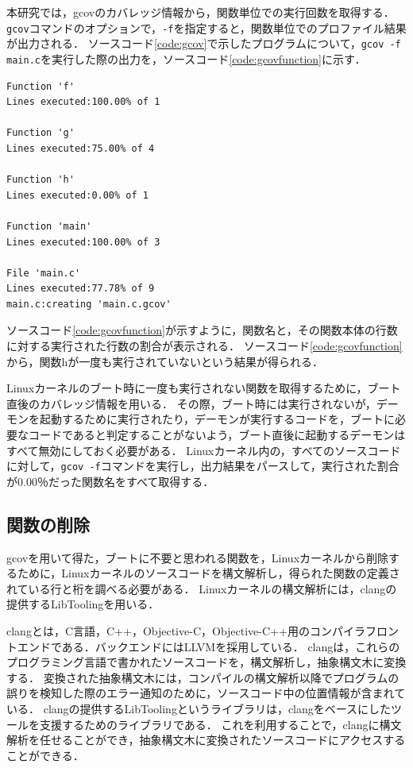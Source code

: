 \documentclass[graduation-thesis]{mlarticle}
\begin{document}
本研究では，gcovのカバレッジ情報から，関数単位での実行回数を取得する．
\texttt{gcov}コマンドのオプションで，\texttt{-f}を指定すると，関数単位でのプロファイル結果が出力される．
ソースコード\ref{code:gcov}で示したプログラムについて，\texttt{gcov -f main.c}を実行した際の出力を，ソースコード\ref{code:gcovfunction}に示す．

\begin{lstlisting}[caption=関数単位でのプロファイル結果, label=code:gcovfunction]
% gcov -f main.c
Function 'f'
Lines executed:100.00% of 1

Function 'g'
Lines executed:75.00% of 4

Function 'h'
Lines executed:0.00% of 1

Function 'main'
Lines executed:100.00% of 3

File 'main.c'
Lines executed:77.78% of 9
main.c:creating 'main.c.gcov'
\end{lstlisting}

ソースコード\ref{code:gcovfunction}が示すように，関数名と，その関数本体の行数に対する実行された行数の割合が表示される．
ソースコード\ref{code:gcovfunction}から，関数hが一度も実行されていないという結果が得られる．

Linuxカーネルのブート時に一度も実行されない関数を取得するために，ブート直後のカバレッジ情報を用いる．
その際，ブート時には実行されないが，デーモンを起動するために実行されたり，デーモンが実行するコードを，ブートに必要なコードであると判定することがないよう，ブート直後に起動するデーモンはすべて無効にしておく必要がある．
Linuxカーネル内の，すべてのソースコードに対して，\texttt{gcov -f}コマンドを実行し，出力結果をパースして，実行された割合が0.00％だった関数名をすべて取得する．

\subsection{関数の削除}
\label{implementation:function}
gcovを用いて得た，ブートに不要と思われる関数を，Linuxカーネルから削除するために，Linuxカーネルのソースコードを構文解析し，得られた関数の定義されている行と桁を調べる必要がある．
Linuxカーネルの構文解析には，clangの提供するLibToolingを用いる．

clangとは，C言語，C++，Objective-C，Objective-C++用のコンパイラフロントエンドである．バックエンドにはLLVMを採用している．
clangは，これらのプログラミング言語で書かれたソースコードを，構文解析し，抽象構文木に変換する．
変換された抽象構文木には，コンパイルの構文解析以降でプログラムの誤りを検知した際のエラー通知のために，ソースコード中の位置情報が含まれている．
clangの提供するLibToolingというライブラリは，clangをベースにしたツールを支援するためのライブラリである．
これを利用することで，clangに構文解析を任せることができ，抽象構文木に変換されたソースコードにアクセスすることができる．
\end{document}
